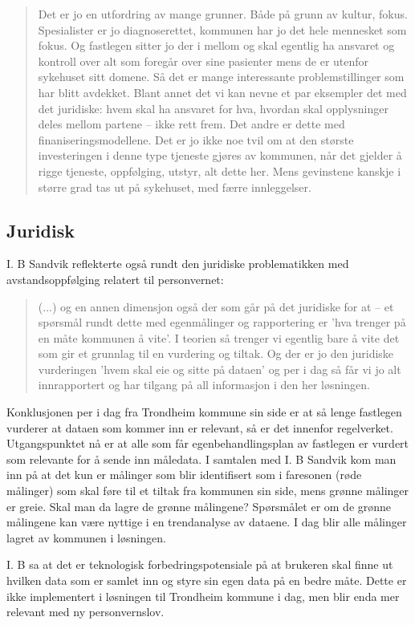 \blockquote{Det er jo en utfordring av mange grunner. Både på grunn av kultur, fokus. Spesialister er jo diagnoserettet, kommunen har jo det hele mennesket som fokus. Og
    fastlegen sitter jo der i mellom og skal egentlig ha ansvaret og kontroll over alt som foregår over sine pasienter mens de er utenfor sykehuset sitt domene. Så det er
    mange interessante problemstillinger som har blitt avdekket. Blant annet det vi kan nevne et par eksempler det med det juridiske: hvem skal ha ansvaret for hva,
    hvordan skal opplysninger deles mellom partene -- ikke rett frem. Det andre er dette med finaniseringsmodellene. Det er jo ikke noe tvil om at den største investeringen
    i denne type tjeneste gjøres av kommunen, når det gjelder å rigge tjeneste, oppfølging, utstyr, alt dette her. Mens gevinstene kanskje i større
grad tas ut på sykehuset, med færre innleggelser.}

\subsection{Juridisk}
I. B Sandvik reflekterte også rundt den juridiske problematikken med avstandsoppfølging relatert til personvernet:
\blockquote{(...) og en annen dimensjon også der som går på det juridiske for at -- et spørsmål rundt dette med egenmålinger og rapportering er
'hva trenger på en måte kommunen å vite'. I teorien så trenger vi egentlig bare å vite det som gir et grunnlag til en vurdering og tiltak.
Og der er jo den juridiske vurderingen 'hvem skal eie og sitte på dataen' og per i dag så får vi jo alt innrapportert og har tilgang på
all informasjon i den her løsningen.}

Konklusjonen per i dag fra Trondheim kommune sin side er at så lenge fastlegen vurderer at dataen som kommer inn er relevant, så er det innenfor
regelverket. Utgangspunktet nå er at alle som får egenbehandlingsplan av fastlegen er vurdert som relevante for å sende inn måledata. I samtalen
med I. B Sandvik kom man inn på at det kun er målinger som blir identifisert som i faresonen (røde målinger) som skal føre til et tiltak fra
kommunen sin side, mens grønne målinger er greie. Skal man da lagre de grønne målingene?
Spørsmålet er om de grønne målingene kan være nyttige i en trendanalyse av dataene.
I dag blir alle målinger lagret av kommunen i løsningen.

I. B sa at det er teknologisk forbedringspotensiale på at brukeren skal finne
ut hvilken data som er samlet inn og styre sin egen data på en bedre måte. Dette er ikke implementert i løsningen til Trondheim kommune i dag,
men blir enda mer relevant med ny personvernslov.

